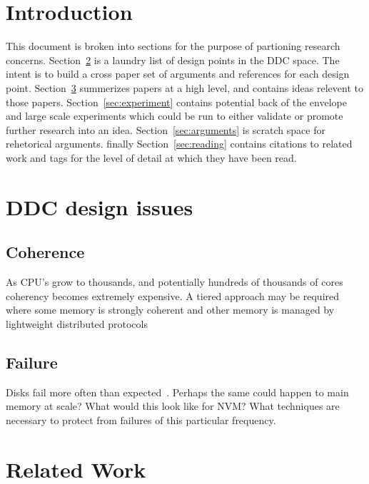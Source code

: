 \section{Introduction}
\label{sec:intro}

This document is broken into sections for the purpose of partioning research
concerns. Section~\ref{sec:issues} is a laundry list of design points in the
DDC space. The intent is to build a cross paper set of arguments and references
for each design point. Section~\ref{sec:related} summerizes papers at a high
level, and contains ideas relevent to those papers.
Section~\ref{sec:experiment} contains potential back of the envelope and large
scale experiments which could be run to either validate or promote further
research into an idea. Section~\ref{sec:arguments} is scratch space for
rehetorical arguments. finally Section~\ref{sec:reading} contains citations to
related work and tags for the level of detail at which they have been read.

\section{DDC design issues}
\label{sec:issues}

\subsection{Coherence}

As CPU's grow to thousands, and potentially hundreds of thousands of cores coherency becomes extremely expensive. A tiered approach may be required where some memory is strongly coherent and other memory is managed by lightweight distributed protocols~\cite{189914}

\subsection{Failure}

Disks fail more often than expected~\cite{Schroeder:2007:DFR:1267903.1267904}.
Perhaps the same could happen to main memory at scale? What would this look
like for NVM? What techniques are necessary to protect from failures of this
particular frequency.

\section{Related Work}
\label{sec:related}

